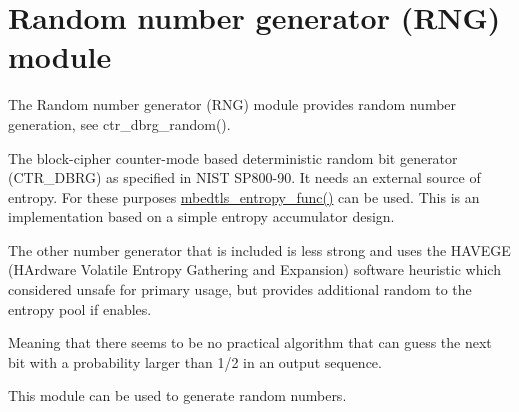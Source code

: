 \hypertarget{group__rng__module}{\section{Random number generator (R\-N\-G) module}
\label{group__rng__module}
}
The Random number generator (R\-N\-G) module provides random number generation, see {\ttfamily ctr\-\_\-dbrg\-\_\-random()}.

The block-\/cipher counter-\/mode based deterministic random bit generator (C\-T\-R\-\_\-\-D\-B\-R\-G) as specified in N\-I\-S\-T S\-P800-\/90. It needs an external source of entropy. For these purposes {\ttfamily \hyperlink{entropy_8h_a81765f6cdf4e5111bcb9f4324f3234cb}{mbedtls\-\_\-entropy\-\_\-func()}} can be used. This is an implementation based on a simple entropy accumulator design.

The other number generator that is included is less strong and uses the H\-A\-V\-E\-G\-E (H\-Ardware Volatile Entropy Gathering and Expansion) software heuristic which considered unsafe for primary usage, but provides additional random to the entropy pool if enables.
\begin{DoxyItemize}
\item Meaning that there seems to be no practical algorithm that can guess the next bit with a probability larger than 1/2 in an output sequence.
\end{DoxyItemize}

This module can be used to generate random numbers. 